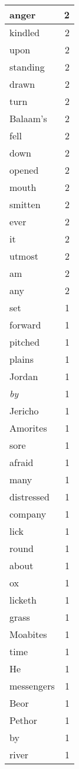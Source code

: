 \begin{center}
\begin{longtable}{l|r}
anger & 2\\ \hline 
kindled & 2\\ \hline 
upon & 2\\ \hline 
standing & 2\\ \hline 
drawn & 2\\ \hline 
turn & 2\\ \hline 
Balaam's & 2\\ \hline 
fell & 2\\ \hline 
down & 2\\ \hline 
opened & 2\\ \hline 
mouth & 2\\ \hline 
smitten & 2\\ \hline 
ever & 2\\ \hline 
it & 2\\ \hline 
utmost & 2\\ \hline 
am & 2\\ \hline 
any & 2\\ \hline 
set & 1\\ \hline 
forward & 1\\ \hline 
pitched & 1\\ \hline 
plains & 1\\ \hline 
Jordan & 1\\ \hline 
\emph{by} & 1\\ \hline 
Jericho & 1\\ \hline 
Amorites & 1\\ \hline 
sore & 1\\ \hline 
afraid & 1\\ \hline 
many & 1\\ \hline 
distressed & 1\\ \hline 
company & 1\\ \hline 
lick & 1\\ \hline 
round & 1\\ \hline 
about & 1\\ \hline 
ox & 1\\ \hline 
licketh & 1\\ \hline 
grass & 1\\ \hline 
Moabites & 1\\ \hline 
time & 1\\ \hline 
He & 1\\ \hline 
messengers & 1\\ \hline 
Beor & 1\\ \hline 
Pethor & 1\\ \hline 
by & 1\\ \hline 
river & 1\\ \hline 

\end{longtable}
\end{center}
